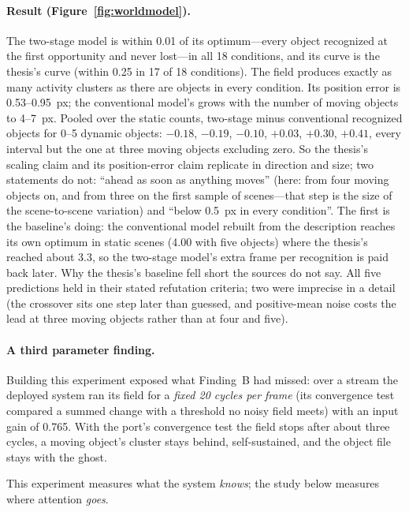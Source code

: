 \documentclass[11pt,a4paper]{article}
\begin{document}
\paragraph{Result (Figure~\ref{fig:worldmodel}).} The two-stage model is within
0.01 of its optimum---every object recognized at the first opportunity and never
lost---in all 18 conditions, and its curve is the thesis's curve (within 0.25 in
17 of 18 conditions). The field produces exactly as many activity clusters as
there are objects in every condition. Its position error is 0.53--0.95~px; the
conventional model's grows with the number of moving objects to 4--7~px. Pooled
over the static counts, two-stage minus conventional recognized objects for 0--5
dynamic objects: $-0.18$, $-0.19$, $-0.10$, $+0.03$, $+0.30$, $+0.41$, every
interval but the one at three moving objects excluding zero. So the thesis's
scaling claim and its position-error claim replicate in direction and size; two
statements do not: ``ahead as soon as anything moves'' (here: from four moving
objects on, and from three on the first sample of scenes---that step is the size
of the scene-to-scene variation) and ``below 0.5~px in every condition''. The first is the baseline's doing: the conventional model rebuilt
from the description reaches its own optimum in static scenes (4.00 with five
objects) where the thesis's reached about 3.3, so the two-stage model's extra
frame per recognition is paid back later. Why the thesis's baseline fell short
the sources do not say. All five predictions held in their stated refutation
criteria; two were imprecise in a detail (the crossover sits one step later than
guessed, and positive-mean noise costs the lead at three moving objects rather
than at four and five).

\paragraph{A third parameter finding.} Building this experiment exposed what
Finding~B had missed: over a stream the deployed system ran its field for a
\emph{fixed 20 cycles per frame} (its convergence test compared a summed change
with a threshold no noisy field meets) with an input gain of 0.765. With the
port's convergence test the field stops after about three cycles, a moving
object's cluster stays behind, self-sustained, and the object file stays with the
ghost.

This experiment measures what the system \emph{knows}; the study below measures
where attention \emph{goes}.
\end{document}
